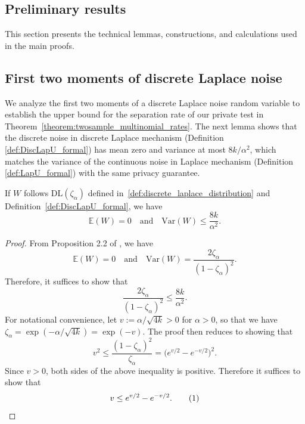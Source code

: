 \documentclass[twoside,11pt]{article}
\newcommand\numberthis{\addtocounter{equation}{1}\tag{\theequation}}
\newcommand{\alphabetSize}{k} %
\newcommand{\privacyParameter}{\alpha} %
\newcommand{\distparamDiscLap}{\zeta}%
\newcommand{\discLapUParam}{\distparamDiscLap_{\privacyParameter}}
\begin{document}
\begin{appendix}
	
	\section{Preliminary results}\label{section:appendix_prelim}
	This section presents the technical lemmas, constructions, and calculations used in the main proofs.
	\subsection{First two moments of discrete Laplace noise}\label{proof:discLapUVar}
	We analyze the first two moments of a discrete Laplace noise random variable to establish the upper bound for the separation rate of our private test in Theorem~\ref{theorem:twosample_multinomial_rates}. The next lemma shows that the discrete noise in discrete Laplace mechanism (Definition \ref{def:DiscLapU_formal}) has mean zero and variance at most $8\alphabetSize/\privacyParameter^2$, which matches the variance of the continuous noise in Laplace mechanism (Definition \ref{def:LapU_formal}) with the same privacy guarantee.
	\begin{lemma}\label{lemma:discLapU_Variance}
		If $W$ follows $ \mathrm{DL}(\discLapUParam)$ defined in~\eqref{def:discrete_laplace_distribution} and Definition~\ref{def:DiscLapU_formal}, we have
		$$
		\mathbb{E}(W) = 0\quad \text{and} \quad\mathrm{Var}(W) \leq \frac{8\alphabetSize}{\privacyParameter^2}.
		$$
		\begin{proof}
			From Proposition 2.2 of \citet{inusah_discrete_2006}, we have
			$$\mathbb{E}(W) = 0
			\quad \text{and} \quad
			\mathrm{Var}(W) = \frac{2\discLapUParam}{(1-\discLapUParam)^2}.$$
			Therefore, it suffices to show that
			$$ \frac{2\discLapUParam}{(1-\discLapUParam)^2} \leq \frac{8\alphabetSize}{\privacyParameter^2}.$$
			For notational convenience, let $v :=  \privacyParameter/\sqrt{4\alphabetSize}>0$ for $\privacyParameter>0$, so that we have $
			\discLapUParam
			=
			\exp({
				-
				\privacyParameter/\sqrt{4\alphabetSize}
			})
			=
			\exp({-v}).$
			The proof then reduces to showing that
			$$
			v^2
			\leq
			\frac{(1 - \discLapUParam)^2}{\discLapUParam} = 
			\bigl(
			e^{v/2} - e^{-v/2}
			\bigr)^2.
			$$
			Since $v>0$, both sides of the above inequality is positive. Therefore it suffices to show that
			\begin{align*}
				v \leq 
				e^{v/2} - e^{-v/2}.
				\numberthis \label{eq:cond_for_disc_var}
			\end{align*}

\end{proof}
\end{lemma}
\end{appendix}
\end{document}
